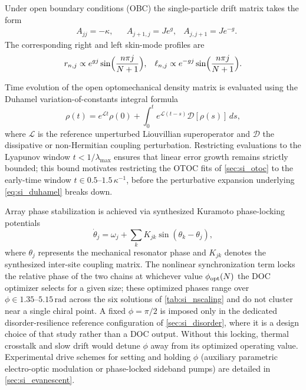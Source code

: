 \documentclass[aps,prxquantum,preprint,superscriptaddress,amsmath,amssymb]{revtex4-2}
\begin{document}
Under open boundary conditions (OBC) the single-particle drift matrix takes the form
\begin{align}\label{eq:si_obc_drift}
&A_{jj}=-\kappa,
&&A_{j+1,j}=J e^{g},
&A_{j,j+1}=J e^{-g}.
\end{align}
The corresponding right and left skin-mode profiles are
\begin{align}\label{eq:si_skin}
&r_{n,j}\propto e^{g j}\sin\Bigl(\frac{n\pi j}{N+1}\Bigr),
&\ell_{n,j}\propto e^{-g j}\sin\Bigl(\frac{n\pi j}{N+1}\Bigr).
\end{align}

Time evolution of the open optomechanical density matrix is evaluated using the Duhamel variation-of-constants integral formula
\begin{equation}\label{eq:si_duhamel}
\rho(t) = e^{\mathcal{L}t}\rho(0) + \int_0^t e^{\mathcal{L}(t-s)}\mathcal{D}[\rho(s)]\, ds,
\end{equation}
where $\mathcal{L}$ is the reference unperturbed Liouvillian superoperator and $\mathcal{D}$ the dissipative or non-Hermitian coupling perturbation. Restricting evaluations to the Lyapunov window $t<1/\lambda_{\max}$ ensures that linear error growth remains strictly bounded; this bound motivates restricting the OTOC fits of \cref{sec:si_otoc} to the early-time window $t\in\numrange{0.5}{1.5}\,\kappa^{-1}$, before the perturbative expansion underlying \cref{eq:si_duhamel} breaks down.

Array phase stabilization is achieved via synthesized Kuramoto phase-locking potentials
\begin{equation}\label{eq:si_kuramoto}
\dot{\theta}_j = \omega_j + \sum_k K_{jk} \sin(\theta_k - \theta_j),
\end{equation}
where $\theta_j$ represents the mechanical resonator phase and $K_{jk}$ denotes the synthesized inter-site coupling matrix. The nonlinear synchronization term locks the relative phase of the two chains at whichever value $\phi_{\rm opt}(N)$ the DOC optimizer selects for a given size; these optimized phases range over $\phi\in\numrange{1.35}{5.15}\,\mathrm{rad}$ across the six solutions of \cref{tab:si_nscaling} and do not cluster near a single chiral point. A fixed $\phi=\pi/2$ is imposed only in the dedicated disorder-resilience reference configuration of \cref{sec:si_disorder}, where it is a design choice of that study rather than a DOC output. Without this locking, thermal crosstalk and slow drift would detune $\phi$ away from its optimized operating value. Experimental drive schemes for setting and holding $\phi$ (auxiliary parametric electro-optic modulation or phase-locked sideband pumps) are detailed in \cref{sec:si_evanescent}.
\end{document}
